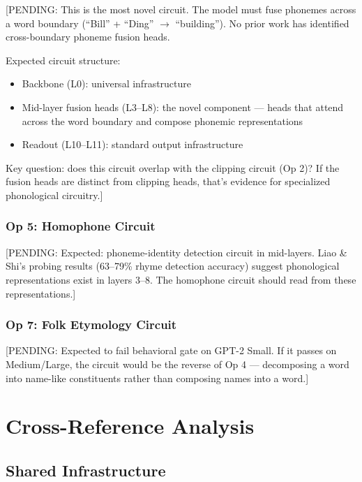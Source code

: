 \documentclass{article}
\newcommand{\PENDING}[1]{{\color{blue}[PENDING: #1]}}
\begin{document}
\PENDING{This is the most novel circuit. The model must fuse phonemes across
a word boundary (``Bill'' + ``Ding'' $\to$ ``building''). No prior work has
identified cross-boundary phoneme fusion heads.

Expected circuit structure:
\begin{itemize}
  \item Backbone (L0): universal infrastructure
  \item Mid-layer fusion heads (L3--L8): the novel component --- heads that
  attend across the word boundary and compose phonemic representations
  \item Readout (L10--L11): standard output infrastructure
\end{itemize}

Key question: does this circuit overlap with the clipping circuit (Op 2)?
If the fusion heads are distinct from clipping heads, that's evidence for
specialized phonological circuitry.}

\subsubsection{Op 5: Homophone Circuit}

\PENDING{Expected: phoneme-identity detection circuit in mid-layers.
Liao \& Shi's probing results (63--79\% rhyme detection accuracy) suggest
phonological representations exist in layers 3--8. The homophone circuit
should read from these representations.}

\subsubsection{Op 7: Folk Etymology Circuit}

\PENDING{Expected to fail behavioral gate on GPT-2 Small. If it passes on
Medium/Large, the circuit would be the reverse of Op 4 --- decomposing a word
into name-like constituents rather than composing names into a word.}

\section{Cross-Reference Analysis}

\subsection{Shared Infrastructure}
\end{document}
